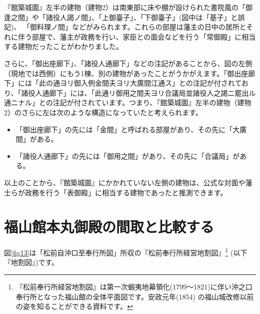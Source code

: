 \documentclass[11pt,report]{jsbook}
\begin{document}
『館築城圖』左半の建物（建物2）は南東部に床や棚が設けられた書院風の「御逢之間」や「諸役人謁ノ間」、「上御臺子」、「下御臺子」(図中は「基子」と誤記)、
「御料理ノ間」などがみられます。これらの部屋は藩主の日中の居所とそれに伴う部屋で、藩主が政務を行い、家臣との面会などを行う「常御殿」に相当する建物だったことがわかりました。

さらに、「御出座廊下」、「諸役人通廊下」などの注記があることから、図の左側（現地では西側）にもう1棟、別の建物があったことがうかがえます。「御出座廊下」には「此の通ヨリ御入例金間夫ヨリ大廣間江通ス」との注記が付されており、「諸役人通廊下」には、「此通リ御用之間夫ヨリ合議局並諸役人之謁ニ罷出ル通ニナル」との注記が付されています。つまり、『館築城圖』左半の建物（建物2）のさらに左は次のような構造になっていたと考えられます。

\begin{itemize}
\item 「御出座廊下」の先には「金間」と呼ばれる部屋があり、その先に「大廣間」がある。
\item 「諸役人通廊下」の先には「御用之間」があり、その先に「合議局」がある。
\end{itemize}

以上のことから、『館築城圖』にかかれていない左側の建物は、公式な対面や藩士らが政務を行う「表御殿」に相当する建物であったと推測できます。

\section{福山館本丸御殿の間取と比較する}
図\ref{fig13}は「松前自沖口至奉行所図」所収の『松前奉行所経営地割図』\footnote{
『松前奉行所経営地割図』は第一次蝦夷地幕領化(1799〜1821)に伴い沖之口奉行所となった福山館の全体平面図です。安政元年(1854)
の福山城改修以前の姿を知ることができる資料です。
}
(以下『地割図』)です。
\end{document}
